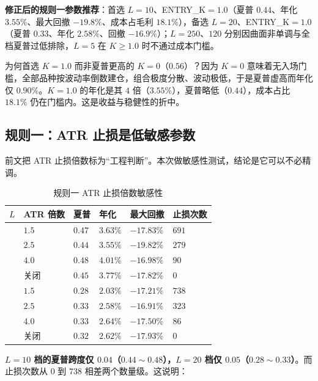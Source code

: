 \textbf{修正后的规则一参数推荐}：首选 $L=10$、ENTRY\_K$=1.0$（夏普 $0.44$、年化 $3.55\%$、最大回撤 $-19.8\%$、成本占毛利 $18.1\%$），备选 $L=20$、ENTRY\_K$=1.0$（夏普 $0.33$、年化 $2.58\%$、回撤 $-16.9\%$）；$L=250$、$120$ 分别因曲面非单调与全档夏普过低排除，$L=5$ 在 $K\ge1.0$ 时不通过成本门槛。

为何首选 $K=1.0$ 而非夏普更高的 $K=0$（$0.56$）？因为 $K=0$ 意味着无入场门槛，全部品种按波动率倒数建仓，组合极度分散、波动极低，于是夏普虚高而年化仅 $0.90\%$。$K=1.0$ 的年化是其 $4$ 倍（$3.55\%$），夏普略低（$0.44$），成本占比 $18.1\%$ 仍在门槛内。这是收益与稳健性的折中。

\subsection{规则一：ATR 止损是低敏感参数}

前文把 ATR 止损倍数标为“工程判断”。本次做敏感性测试，结论是它可以不必精调。

\begin{table}[htbp]
\centering\footnotesize
\caption{规则一 ATR 止损倍数敏感性}\label{tab:r1atr}
\begin{tabular}{@{}>{\raggedright\arraybackslash}p{1.5cm}>{\raggedright\arraybackslash}p{1.9cm}>{\raggedright\arraybackslash}p{1.9cm}>{\raggedright\arraybackslash}p{2.1cm}>{\raggedright\arraybackslash}p{2.1cm}>{\raggedright\arraybackslash}p{2.1cm}@{}}
\toprule
\textbf{$L$} & \textbf{ATR 倍数} & \textbf{夏普} & \textbf{年化} & \textbf{最大回撤} & \textbf{止损次数} \\
\midrule
\multirow{4}{*}{$10$} & $1.5$ & $0.47$ & $3.63\%$ & $-17.83\%$ & $691$ \\
 & $2.5$ & $0.44$ & $3.55\%$ & $-19.82\%$ & $279$ \\
 & $4.0$ & $0.48$ & $4.01\%$ & $-16.98\%$ & $90$ \\
 & 关闭 & $0.45$ & $3.77\%$ & $-17.82\%$ & $0$ \\
\midrule
\multirow{4}{*}{$20$} & $1.5$ & $0.28$ & $2.03\%$ & $-17.21\%$ & $738$ \\
 & $2.5$ & $0.33$ & $2.58\%$ & $-16.91\%$ & $323$ \\
 & $4.0$ & $0.33$ & $2.64\%$ & $-17.50\%$ & $86$ \\
 & 关闭 & $0.32$ & $2.62\%$ & $-17.93\%$ & $0$ \\
\bottomrule
\end{tabular}
\end{table}

\textbf{$L=10$ 档的夏普跨度仅 $0.04$（$0.44\sim0.48$），$L=20$ 档仅 $0.05$（$0.28\sim0.33$）}。而止损次数从 $0$ 到 $738$ 相差两个数量级。这说明：

